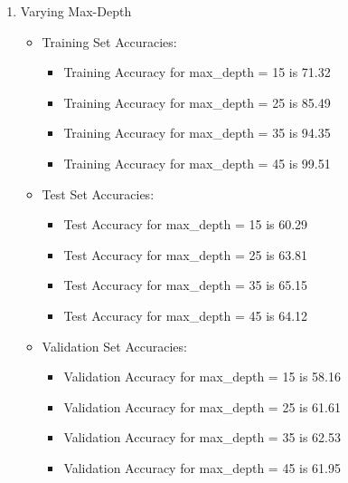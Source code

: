 \begin{enumerate}[label=(\alph*)]
          \begin{enumerate}[label=\roman*.]
              \item Varying Max-Depth
                    \begin{itemize}
                        \item Training Set Accuracies:
                              \begin{itemize}
                                  \item Training Accuracy for max\_depth = 15 is 71.32
                                  \item Training Accuracy for max\_depth = 25 is 85.49
                                  \item Training Accuracy for max\_depth = 35 is 94.35
                                  \item Training Accuracy for max\_depth = 45 is 99.51
                              \end{itemize}
                        \item Test Set Accuracies:
                              \begin{itemize}
                                  \item Test Accuracy for max\_depth = 15 is 60.29
                                  \item Test Accuracy for max\_depth = 25 is 63.81
                                  \item Test Accuracy for max\_depth = 35 is 65.15
                                  \item Test Accuracy for max\_depth = 45 is 64.12
                              \end{itemize}
                        \item Validation Set Accuracies:
                              \begin{itemize}
                                  \item Validation Accuracy for max\_depth = 15 is 58.16
                                  \item Validation Accuracy for max\_depth = 25 is 61.61
                                  \item Validation Accuracy for max\_depth = 35 is 62.53
                                  \item Validation Accuracy for max\_depth = 45 is 61.95
                              \end{itemize}
                    \end{itemize}

\end{enumerate}
\end{enumerate}
